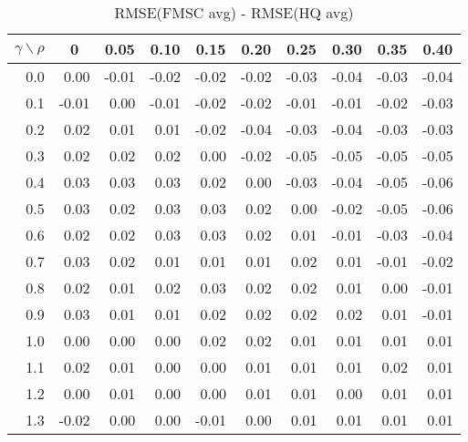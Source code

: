 \documentclass[12pt]{article}
\begin{document}
%
\begin{table}[!tbp]
\caption{RMSE(FMSC avg) - RMSE(HQ avg)}
 \begin{center}
 \begin{tabular}{r|rrrrrrrrr}\hline\hline
\multicolumn{1}{c|}{$\gamma\backslash\rho$}&\multicolumn{1}{c}{0}&\multicolumn{1}{c}{0.05}&\multicolumn{1}{c}{0.10}&\multicolumn{1}{c}{0.15}&\multicolumn{1}{c}{0.20}&\multicolumn{1}{c}{0.25}&\multicolumn{1}{c}{0.30}&\multicolumn{1}{c}{0.35}&\multicolumn{1}{c}{0.40}\tabularnewline
\hline

0.0& 0.00&-0.01&-0.02&-0.02&-0.02&-0.03&-0.04&-0.03&-0.04\tabularnewline
0.1&-0.01& 0.00&-0.01&-0.02&-0.02&-0.01&-0.01&-0.02&-0.03\tabularnewline
0.2& 0.02& 0.01& 0.01&-0.02&-0.04&-0.03&-0.04&-0.03&-0.03\tabularnewline
0.3& 0.02& 0.02& 0.02& 0.00&-0.02&-0.05&-0.05&-0.05&-0.05\tabularnewline
0.4& 0.03& 0.03& 0.03& 0.02& 0.00&-0.03&-0.04&-0.05&-0.06\tabularnewline
0.5& 0.03& 0.02& 0.03& 0.03& 0.02& 0.00&-0.02&-0.05&-0.06\tabularnewline
0.6& 0.02& 0.02& 0.03& 0.03& 0.02& 0.01&-0.01&-0.03&-0.04\tabularnewline
0.7& 0.03& 0.02& 0.01& 0.01& 0.01& 0.02& 0.01&-0.01&-0.02\tabularnewline
0.8& 0.02& 0.01& 0.02& 0.03& 0.02& 0.02& 0.01& 0.00&-0.01\tabularnewline
0.9& 0.03& 0.01& 0.01& 0.02& 0.02& 0.02& 0.02& 0.01&-0.01\tabularnewline
1.0& 0.00& 0.00& 0.00& 0.02& 0.02& 0.01& 0.01& 0.01& 0.01\tabularnewline
1.1& 0.02& 0.01& 0.00& 0.00& 0.01& 0.01& 0.01& 0.02& 0.01\tabularnewline
1.2& 0.00& 0.01& 0.00& 0.00& 0.01& 0.01& 0.00& 0.01& 0.01\tabularnewline
1.3&-0.02& 0.00& 0.00&-0.01& 0.00& 0.01& 0.01& 0.01& 0.01\tabularnewline
\hline
\end{tabular}

\end{center}

\end{table}
\end{document}
